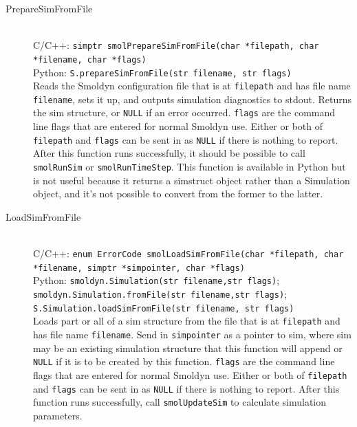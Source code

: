 \documentclass {scrbook}
\newcommand {\ttt} {\texttt}
\begin{document}
\begin{description}

\item[PrepareSimFromFile]
\hfill \\
C/C++: \ttt{simptr smolPrepareSimFromFile(char *filepath, char *filename, char *flags)}\\
Python: \ttt{S.prepareSimFromFile(str filename, str flags)}\\
Reads the Smoldyn configuration file that is at \ttt{filepath} and has file name \ttt{filename}, sets it up, and outputs simulation diagnostics to stdout. Returns the sim structure, or \ttt{NULL} if an error occurred. \ttt{flags} are the command line flags that are entered for normal Smoldyn use. Either or both of \ttt{filepath} and \ttt{flags} can be sent in as \ttt{NULL} if there is nothing to report. After this function runs successfully, it should be possible to call \ttt{smolRunSim} or \ttt{smolRunTimeStep}. This function is available in Python but is not useful because it returns a simstruct object rather than a Simulation object, and it's not possible to convert from the former to the latter.

\item[LoadSimFromFile]
\hfill \\
C/C++: \ttt{enum ErrorCode smolLoadSimFromFile(char *filepath, char *filename, simptr *simpointer, char *flags)}\\
Python: \ttt{smoldyn.Simulation(str filename,str flags)}; \ttt{smoldyn.Simulation.fromFile(str filename,str flags)}; \ttt{S.Simulation.loadSimFromFile(str filename, str flags)}\\
Loads part or all of a sim structure from the file that is at \ttt{filepath} and has file name \ttt{filename}. Send in \ttt{simpointer} as a pointer to sim, where sim may be an existing simulation structure that this function will append or \ttt{NULL} if it is to be created by this function. \ttt{flags} are the command line flags that are entered for normal Smoldyn use. Either or both of \ttt{filepath} and \ttt{flags} can be sent in as \ttt{NULL} if there is nothing to report. After this function runs successfully, call \ttt{smolUpdateSim} to calculate simulation parameters.


\end{description}
\end{document}
